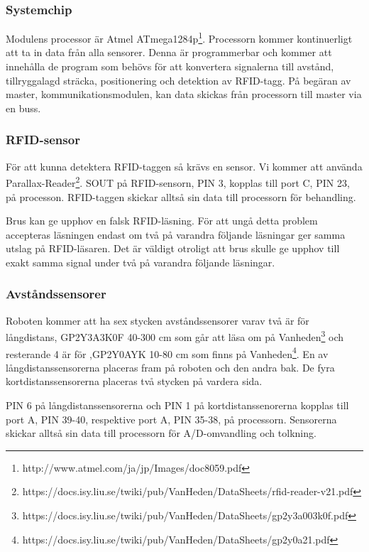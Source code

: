 \documentclass[a4paper,12pt,fleqn]{article}
\begin{document}
\subsubsection{Systemchip}
Modulens processor är Atmel ATmega1284p\footnote{http://www.atmel.com/ja/jp/Images/doc8059.pdf}. Processorn kommer kontinuerligt att ta in data från alla sensorer. Denna är programmerbar och kommer att innehålla de program som behövs för att konvertera signalerna till avstånd, tillryggalagd sträcka, positionering och detektion av RFID-tagg. På begäran av master, kommunikationsmodulen, kan data skickas från processorn till master via en buss.

\subsubsection{RFID-sensor}
För att kunna detektera RFID-taggen så krävs en sensor. Vi kommer att använda Par\-all\-ax-Read\-er\footnote{https://docs.isy.liu.se/twiki/pub/VanHeden/DataSheets/rfid-reader-v21.pdf}. 
SOUT på RFID-sensorn, PIN 3, kopplas till port C, PIN 23, på processon. RFID-taggen skickar alltså sin data till processorn för behandling.

Brus kan ge upphov en falsk RFID-läsning. För att ungå detta problem accepteras läsningen endast om två på varandra följande läsningar ger samma utslag på RFID-läsaren. Det är väldigt otroligt att brus skulle ge upphov till exakt samma signal under två på varandra följande läsningar.

\subsubsection{Avståndssensorer}
Roboten kommer att ha sex stycken av\-stånds\-sensorer varav två är för lång\-distans, GP\-2Y3A\-3K\-0F 40-300 cm som går att läsa om på Vanheden\footnote{https://docs.isy.liu.se/twiki/pub/VanHeden/DataSheets/gp2y3a003k0f.pdf}  och resterande 4 är för ,GP\-2Y\-0A\-YK 10-80 cm som finns på Vanheden\footnote{https://docs.isy.liu.se/twiki/pub/VanHeden/DataSheets/gp2y0a21.pdf}. En av långdistanssensorerna placeras fram på roboten och den andra bak. De fyra kortdistanssensorerna placeras två stycken på vardera sida.

PIN 6 på långdistanssensorerna och PIN 1 på kortdistanssenorerna kopplas till port A, PIN 39-40, respektive port A, PIN 35-38, på processorn. Sensorerna skickar alltså sin data till processorn för A/D-omvandling och tolkning.
\end{document}
